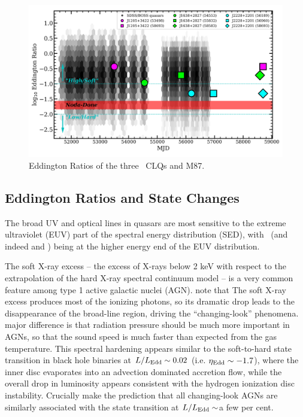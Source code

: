 \documentclass[fleqn,usenatbib]{mnras}
\begin{document}
\begin{figure}
  \centering
  \includegraphics[width=14.5cm, trim=0.2cm 0.2cm 0.0cm 0.2cm, clip]
  {figures/MJD_vs_Eddington_20191129.png}
  \vspace{-12pt}
  \caption[]{Eddington Ratios of the three \civ\ CLQs and M87.}
  \label{fig:Eddington_ratios}
\end{figure}
\subsection{Eddington Ratios and State Changes} 
The broad UV and optical lines in quasars are most sensitive to the
extreme ultraviolet (EUV) part of the spectral energy distribution
(SED), with \civ\ (and indeed \heii and \nv) being at the higher
energy end of the EUV distribution.

The soft X-ray excess -- the excess of X-rays below 2 keV with respect
to the extrapolation of the hard X-ray spectral continuum model -- is
a very common feature among type 1 active galactic nuclei (AGN). 
\citet{NodaDone2018} note that
The soft X-ray excess produces most of the ionizing photons, so its
dramatic drop leads to the disappearance of the broad-line region,
driving the ``changing-look'' phenomena.  major difference is that
radiation pressure should be much more important in AGNs, so that the
sound speed is much faster than expected from the gas temperature.
This spectral hardening appears similar to the soft-to-hard state
transition in black hole binaries at $L / L_{\rm Edd} \sim 0.02$
(i.e. $\eta_{\rm Edd} \sim -1.7$), where the inner disc evaporates into
an advection dominated accretion flow, while the overall drop in
luminosity appears consistent with the hydrogen ionization disc
instability.  Crucially \citet{NodaDone2018} make the prediction that
all changing-look AGNs are similarly associated with the state
transition at $L / L_{\rm Edd} \sim$a few per cent.
\end{document}
